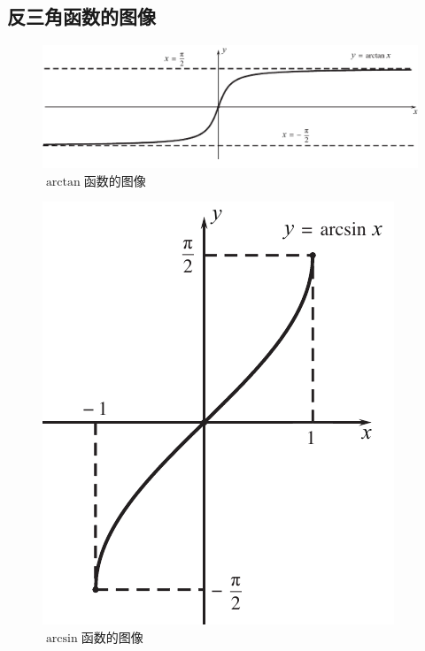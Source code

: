 \subsection{反三角函数的图像}
\begin{figure}[!htb]
	\centering
	\includegraphics[width = 0.8\linewidth]{pic/C-F/arctan.pdf}
	\vspace*{-1em}
	\caption{$\arctan$函数的图像}
	\label{atan}
\end{figure}
\begin{figure}[!htb]
	\begin{minipage}{0.49\linewidth}
		\centering
		\includegraphics[width=0.89\linewidth]{pic/C-F/arcsin.pdf}
		\caption{$\arcsin$函数的图像}
		\label{asin}
	\end{minipage}
	\begin{minipage}{0.49\linewidth}
		\centering

\end{minipage}
\end{figure}
